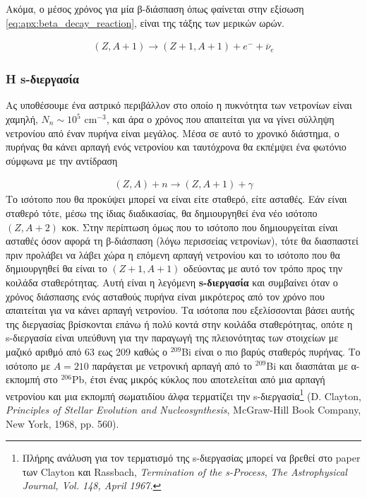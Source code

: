 Ακόμα, ο μέσος χρόνος για μία β-διάσπαση όπως φαίνεται στην εξίσωση \eqref{eq:apx:beta_decay_reaction}, είναι της τάξης των μερικών ωρών.

\begin{eqnarray}
\label{eq:apx:beta_decay_reaction}
(Z, A+1) \longrightarrow (Z+1, A+1) + e^{-} + \overline{\nu}_e
\end{eqnarray}
\subsubsection{Η s-διεργασία}
Ας υποθέσουμε ένα αστρικό περιβάλλον στο οποίο η πυκνότητα των νετρονίων είναι χαμηλή, $N_n \sim 10^5 $ cm$^{-3}$, και άρα ο χρόνος που απαιτείται για να γίνει σύλληψη νετρονίου από έναν πυρήνα είναι μεγάλος. Μέσα σε αυτό το χρονικό διάστημα, ο πυρήνας θα κάνει αρπαγή ενός νετρονίου και ταυτόχρονα θα εκπέμψει ένα φωτόνιο σύμφωνα με την αντίδραση

\begin{eqnarray}
\label{eq:apx:neutron_capture_reaction}
(Z, A) + n \longrightarrow (Z, A+1) + \gamma
\end{eqnarray}
Το ισότοπο που θα προκύψει μπορεί να είναι είτε σταθερό, είτε ασταθές. Εάν είναι σταθερό τότε, μέσω της ίδιας διαδικασίας, θα δημιουργηθεί ένα νέο ισότοπο $(Z, A+2)$ κοκ. Στην περίπτωση όμως που το ισότοπο που δημιουργείται είναι ασταθές όσον αφορά τη β-διάσπαση (λόγω περισσείας νετρονίων), τότε θα διασπαστεί πριν προλάβει να λάβει χώρα η επόμενη αρπαγή νετρονίου και το ισότοπο που θα δημιουργηθεί θα είναι το $(Z+1, A+1)$ οδεύοντας με αυτό τον τρόπο προς την κοιλάδα σταθερότητας. Αυτή είναι η λεγόμενη \textbf{s-διεργασία} και συμβαίνει όταν ο χρόνος διάσπασης ενός ασταθούς πυρήνα είναι μικρότερος από τον χρόνο που απαιτείται για να κάνει αρπαγή νετρονίου. Τα ισότοπα που εξελίσσονται βάσει αυτής της διεργασίας βρίσκονται επάνω ή πολύ κοντά στην κοιλάδα σταθερότητας, οπότε η s-διεργασία είναι υπεύθυνη για την παραγωγή της πλειονότητας των στοιχείων με μαζικό αριθμό από 63 εως 209 καθώς ο $^{209}$Bi είναι ο πιο βαρύς σταθερός πυρήνας. Το ισότοπο με $A=210$ παράγεται με νετρονική αρπαγή από το $^{209}$Bi και διασπάται με α-εκπομπή στο $^{206}$Pb, έτσι ένας μικρός κύκλος που αποτελείται από μια αρπαγή νετρονίου και μια εκπομπή σωματιδίου άλφα τερματίζει την s-διεργασία\footnote{Πλήρης ανάλυση για τον τερματισμό της s-διεργασίας μπορεί να βρεθεί στο paper των Clayton και Rassbach, \textit{Termination of the s-Process}, \textit{The Astrophysical Journal, Vol. 148, April 1967.}} (D. Clayton, \textit{Principles of Stellar Evolution and Nucleosynthesis}, McGraw-Hill Book Company, New York, 1968, pp. 560).

